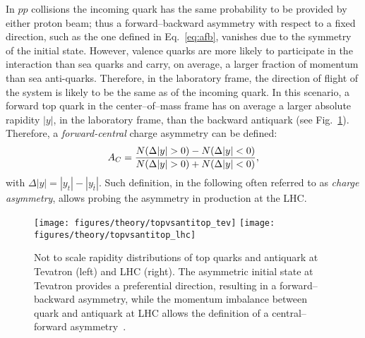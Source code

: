 In $pp$ collisions the incoming quark has the same probability to be provided by
either proton beam; thus a forward--backward asymmetry with respect to
a fixed direction, such as the one defined in Eq.~\ref{eq:afb},
vanishes due to the symmetry of the initial state. However, valence
quarks are more likely to participate in the interaction than sea
quarks and carry, on average, a larger fraction of momentum than sea
anti-quarks. Therefore, in the laboratory frame, the direction of
flight of the \ttbar{} system is likely to be the same as of the
incoming quark. In this scenario, a forward top quark in the \ttbar{}
center--of--mass frame has on average a larger absolute rapidity
$|y|$, in the laboratory frame, than the backward antiquark (see
Fig.~\ref{fig:rapidities}).
Therefore, a {\it forward-central} charge asymmetry \ac{} can be defined:
\begin{equation}
\label{eq:ac}
\ac{}=\frac{N(\Delta{}|y|>0)-N(\Delta{}|y|<0)}{N(\Delta{}|y|>0)+N(\Delta{}|y|<0)},
\end{equation}
with $\Delta{}|y|=|y_t| - |y_{\bar{t}}|$.
Such definition, in the following often referred to as {\it charge
  asymmetry}, allows probing the asymmetry in \ttbar{} production at
the LHC. 

\begin{figure}[!htb]
  \centering
  \texttt{[image: figures/theory/topvsantitop\_tev]} 
  \texttt{[image: figures/theory/topvsantitop\_lhc]} 
  \caption{Not to scale rapidity distributions of top
    quarks and antiquark at Tevatron (left) and LHC (right). The
    asymmetric initial state at Tevatron provides a preferential
    direction, resulting in a forward--backward asymmetry, while the
    momentum imbalance between quark and antiquark at LHC allows the
    definition of a central--forward asymmetry~\cite{Rodrigo:2012as}.} 
  \label{fig:rapidities}
\end{figure}

